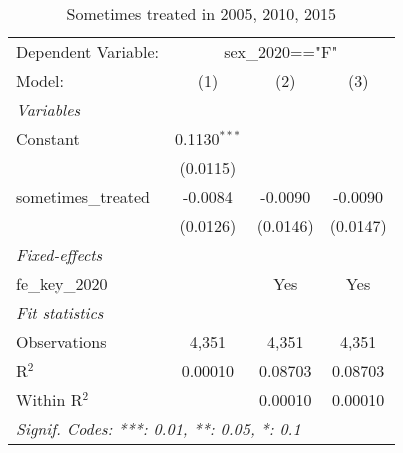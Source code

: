
\begin{table}[htbp]
   \caption{Sometimes treated in 2005, 2010, 2015}
   \centering
   \begin{tabular}{lccc}
      \tabularnewline \midrule \midrule
      Dependent Variable: & \multicolumn{3}{c}{sex\_2020=="F"}\\
      Model:              & (1)            & (2)      & (3)\\  
      \midrule
      \emph{Variables}\\
      Constant            & 0.1130$^{***}$ &          &   \\   
                          & (0.0115)       &          &   \\   
      sometimes\_treated  & -0.0084        & -0.0090  & -0.0090\\   
                          & (0.0126)       & (0.0146) & (0.0147)\\   
      \midrule
      \emph{Fixed-effects}\\
      fe\_key\_2020       &                & Yes      & Yes\\  
      \midrule
      \emph{Fit statistics}\\
      Observations        & 4,351          & 4,351    & 4,351\\  
      R$^2$               & 0.00010        & 0.08703  & 0.08703\\  
      Within R$^2$        &                & 0.00010  & 0.00010\\  
      \midrule \midrule
      \multicolumn{4}{l}{\emph{Signif. Codes: ***: 0.01, **: 0.05, *: 0.1}}\\
   \end{tabular}
\end{table}


